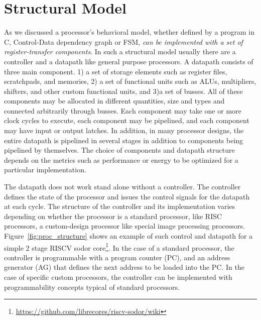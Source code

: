 \section{Structural Model}

As we discussed a processor’s behavioral model, whether defined by a program in C, Control-Data dependency graph or FSM, \emph{can be implemented with a set of register-transfer components}.
In such a structural model usually there are a controller and a datapath like general purpose processors.
A datapath consists of three main component. 1) a set of storage elements such as register files, scratchpads, and memories, 2) a set of functional units such as ALUs, multipliers, shifters, and other custom functional units, and 3)a set of busses.
All of these components may be allocated in different quantities, size and types and connected arbitrarily through busses.
Each component may take one or more clock cycles to execute, each component may be pipelined, and each component may have input or output latches.
In addition, in many processor designs, the entire datapath is pipelined in several stages in addition to components being pipelined by themselves.
The choice of components and datapath structure depends on the metrics such as performance or energy to be optimized for a particular implementation.

The datapath does not work stand alone without a controller.
The controller defines the state of the processor and issues the control signals for the datapath at each cycle.
The structure of the controller and its implementation varies depending on whether the processor is a standard processor, like RISC processors, a custom-design processor like special image processing processors. 
Figure~\ref{fig:proc_structure} shows an example of such control and datapath for a simple 2 stage RISCV sodor core\footnote{\url{https://github.com/librecores/riscv-sodor/wiki}}.
In the case of a standard processor, the controller is programmable with a program counter (PC), and an address generator (AG) that defines the next address to be loaded into the PC.
In the case of specific custom processors, the controller can be implemented with programmability concepts typical of standard processors.



